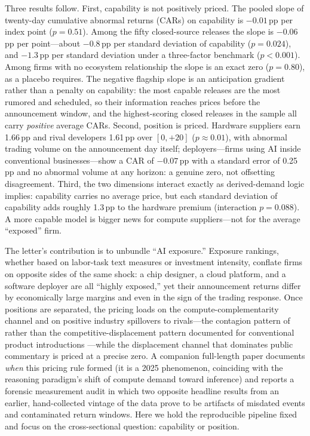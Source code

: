 \documentclass[review,12pt,authoryear]{elsarticle}
\newcommand{\pp}{\,pp}
\begin{document}
Three results follow. First, capability is not positively priced. The pooled
slope of twenty-day cumulative abnormal returns (CARs) on capability is
$-0.01$\pp{} per index point ($p=0.51$). Among the fifty closed-source
releases the slope is $-0.06$\pp{} per point---about $-0.8$\pp{} per
standard deviation of capability ($p=0.024$), and $-1.3$\pp{} per standard
deviation under a three-factor benchmark ($p<0.001$). Among firms with no
ecosystem relationship the slope is an exact zero ($p=0.80$), as a placebo
requires. The negative flagship slope is an anticipation gradient rather
than a penalty on capability: the most capable releases are the most rumored
and scheduled, so their information reaches prices before the announcement
window, and the highest-scoring closed releases in the sample all carry
\emph{positive} average CARs. Second, position is priced. Hardware suppliers
earn 1.66\pp{} and rival developers 1.61\pp{} over $[0,+20]$
($p\approx0.01$), with abnormal trading volume on the announcement day
itself; deployers---firms using AI inside conventional businesses---show a
CAR of $-0.07$\pp{} with a standard error of 0.25\pp{} and no abnormal
volume at any horizon: a genuine zero, not offsetting disagreement. Third,
the two dimensions interact exactly as derived-demand logic implies:
capability carries no average price, but each standard deviation of
capability adds roughly 1.3\pp{} to the hardware premium (interaction
$p=0.088$). A more capable model is bigger news for compute suppliers---not
for the average ``exposed'' firm.

The letter's contribution is to unbundle ``AI exposure.'' Exposure rankings,
whether based on labor-task text measures or investment intensity, conflate
firms on opposite sides of the same shock: a chip designer, a cloud
platform, and a software deployer are all ``highly exposed,'' yet their
announcement returns differ by economically large margins and even in the
sign of the trading response. Once positions are separated, the pricing
loads on the compute-complementarity channel and on positive industry
spillovers to rivals---the contagion pattern of \citet{lang1992} rather than
the competitive-displacement pattern documented for conventional product
introductions \citep{chen2005}---while the displacement channel that
dominates public commentary is priced at a precise zero. A companion
full-length paper documents \emph{when} this pricing rule formed (it is a
2025 phenomenon, coinciding with the reasoning paradigm's shift of compute
demand toward inference) and reports a forensic measurement audit in which
two opposite headline results from an earlier, hand-collected vintage of the
data prove to be artifacts of misdated events and contaminated return
windows. Here we hold the reproducible pipeline fixed and focus on the
cross-sectional question: capability or position.
\end{document}
